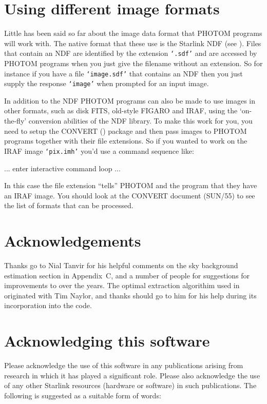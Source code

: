 \documentclass[twoside,11pt,nolof]{starlink}
\providecommand{\st}[1]{\texttt{`#1'}}
\begin{document}
\section{Using different \label{dataformat}image formats}

Little has been said so far about the image data format that PHOTOM
programs will work with. The native format that these use is the
Starlink NDF (see ). Files that
contain an NDF are identified by the extension \st{.sdf} and are
accessed by PHOTOM programs when you just give the filename without an
extension. So for instance if you have a file \st{image.sdf} that
contains an NDF then you just supply the response \st{image} when
prompted for an input image.

In addition to the NDF PHOTOM programs can also be made to use images
in other formats, such as disk FITS, old-style FIGARO and IRAF, using
the `on-the-fly' conversion abilities of the NDF library.
To make this work for you, you need to setup the CONVERT
() package and then pass images to PHOTOM
programs together with their file extensions. So if you wanted to work
on the IRAF image \st{pix.imh} you'd use a command sequence like:
\begin{terminalv}
... enter interactive command loop ...
\end{terminalv}
In this case the file extension ``tells'' PHOTOM and the
 program  that they
have an IRAF image. You should look at the CONVERT document (SUN/55)
to see the list of formats that can be processed.

\section{Acknowledgements}

Thanks go to Nial Tanvir for his helpful comments on the sky background
estimation section in Appendix~C, and a number of people for suggestions
for improvements to  over the years. The optimal extraction algorithim used in  originated with
Tim Naylor, and thanks should go to him for his help during its incorporation
into the code.

\section{Acknowledging this software}
Please acknowledge the use of this software in any publications arising
from research in which it has played a significant role. Please also
acknowledge the use of any other Starlink resources (hardware or
software) in such publications. The following is suggested as a suitable
form of words:
\end{document}
